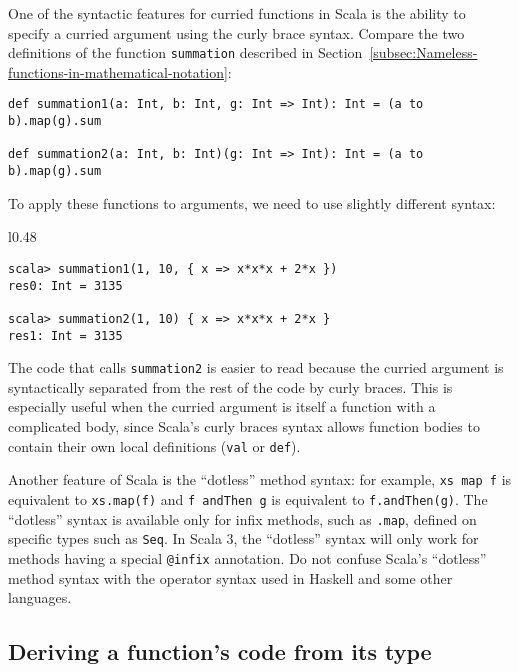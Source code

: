 One of the syntactic features for curried functions in Scala is the
ability to specify a curried argument using the curly brace syntax.
Compare the two definitions of the function \lstinline!summation!
described in Section~\ref{subsec:Nameless-functions-in-mathematical-notation}:
\begin{lstlisting}
def summation1(a: Int, b: Int, g: Int => Int): Int = (a to b).map(g).sum

def summation2(a: Int, b: Int)(g: Int => Int): Int = (a to b).map(g).sum
\end{lstlisting}
To apply these functions to arguments, we need to use slightly different
syntax:

\begin{wrapfigure}{l}{0.48\columnwidth}%
\vspace{-0.5\baselineskip}
\begin{lstlisting}
scala> summation1(1, 10, { x => x*x*x + 2*x })
res0: Int = 3135

scala> summation2(1, 10) { x => x*x*x + 2*x }
res1: Int = 3135
\end{lstlisting}
\vspace{-0.75\baselineskip}
\end{wrapfigure}%

\noindent The code that calls \lstinline!summation2! is easier to
read because the curried argument is syntactically separated from
the rest of the code by curly braces. This is especially useful when
the curried argument is itself a function with a complicated body,
since Scala's curly braces syntax allows function bodies to contain
their own local definitions (\lstinline!val! or \lstinline!def!).

Another feature of Scala is the ``dotless'' method syntax: for example,
\lstinline!xs map f! is equivalent to \lstinline!xs.map(f)! and
\lstinline!f andThen g! is equivalent to \lstinline!f.andThen(g)!.
The ``dotless'' syntax is available only for infix methods, such
as \lstinline!.map!, defined on specific types such as \lstinline!Seq!.
In Scala 3, the ``dotless'' syntax will only work for methods having
a special \lstinline!@infix! annotation. Do not confuse Scala's ``dotless''
method syntax with the operator syntax used in Haskell and some other
languages.

\subsection{Deriving a function's code from its type\label{subsec:Deriving-a-function's}}

